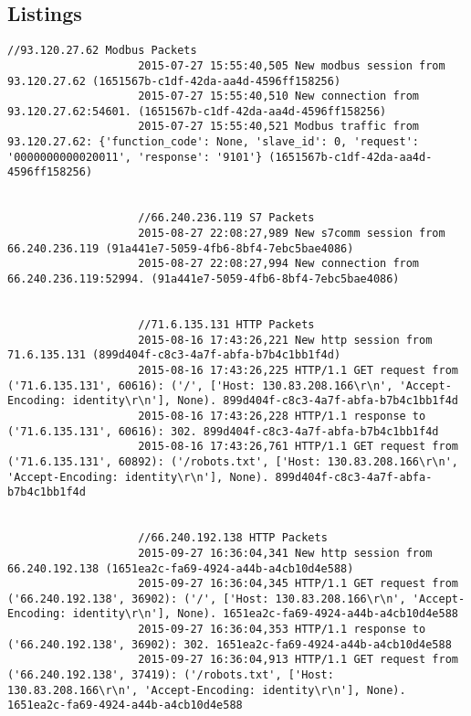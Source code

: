 \documentclass[article,msc=informatik,type=msc,colorback,accentcolor=tud9c]{tudthesis}
\begin{document}
\begin{appendix}
  	      \newpage
  	      \section{Listings}
  	      
  	      
  	      		\begin{lstlisting}[caption=Packets received from Shodan Probes,label=lst:Packets received from Shodan Probes]
  	      			//93.120.27.62 Modbus Packets
  	      			2015-07-27 15:55:40,505 New modbus session from 93.120.27.62 (1651567b-c1df-42da-aa4d-4596ff158256)
  	      			2015-07-27 15:55:40,510 New connection from 93.120.27.62:54601. (1651567b-c1df-42da-aa4d-4596ff158256)
  	      			2015-07-27 15:55:40,521 Modbus traffic from 93.120.27.62: {'function_code': None, 'slave_id': 0, 'request': '0000000000020011', 'response': '9101'} (1651567b-c1df-42da-aa4d-4596ff158256)
  	      			
  	      			
  	      			//66.240.236.119 S7 Packets
  	      			2015-08-27 22:08:27,989 New s7comm session from 66.240.236.119 (91a441e7-5059-4fb6-8bf4-7ebc5bae4086)
  	      			2015-08-27 22:08:27,994 New connection from 66.240.236.119:52994. (91a441e7-5059-4fb6-8bf4-7ebc5bae4086)
  	      			
  	      			
  	      			//71.6.135.131 HTTP Packets
  	      			2015-08-16 17:43:26,221 New http session from 71.6.135.131 (899d404f-c8c3-4a7f-abfa-b7b4c1bb1f4d)
  	      			2015-08-16 17:43:26,225 HTTP/1.1 GET request from ('71.6.135.131', 60616): ('/', ['Host: 130.83.208.166\r\n', 'Accept-Encoding: identity\r\n'], None). 899d404f-c8c3-4a7f-abfa-b7b4c1bb1f4d
  	      			2015-08-16 17:43:26,228 HTTP/1.1 response to ('71.6.135.131', 60616): 302. 899d404f-c8c3-4a7f-abfa-b7b4c1bb1f4d
  	      			2015-08-16 17:43:26,761 HTTP/1.1 GET request from ('71.6.135.131', 60892): ('/robots.txt', ['Host: 130.83.208.166\r\n', 'Accept-Encoding: identity\r\n'], None). 899d404f-c8c3-4a7f-abfa-b7b4c1bb1f4d
  	      			
  	      			
  	      			//66.240.192.138 HTTP Packets
  	      			2015-09-27 16:36:04,341 New http session from 66.240.192.138 (1651ea2c-fa69-4924-a44b-a4cb10d4e588)
  	      			2015-09-27 16:36:04,345 HTTP/1.1 GET request from ('66.240.192.138', 36902): ('/', ['Host: 130.83.208.166\r\n', 'Accept-Encoding: identity\r\n'], None). 1651ea2c-fa69-4924-a44b-a4cb10d4e588
  	      			2015-09-27 16:36:04,353 HTTP/1.1 response to ('66.240.192.138', 36902): 302. 1651ea2c-fa69-4924-a44b-a4cb10d4e588
  	      			2015-09-27 16:36:04,913 HTTP/1.1 GET request from ('66.240.192.138', 37419): ('/robots.txt', ['Host: 130.83.208.166\r\n', 'Accept-Encoding: identity\r\n'], None). 1651ea2c-fa69-4924-a44b-a4cb10d4e588
  	      			

\end{lstlisting}
\end{appendix}
\end{document}

